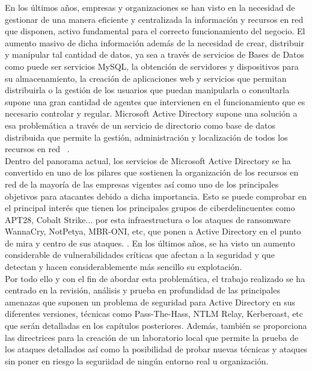 En los últimos años, empresas y organizaciones se han visto en la necesidad de gestionar de una manera eficiente y centralizada la información y recursos en red que disponen, activo fundamental para el correcto funcionamiento del negocio. El aumento masivo de dicha información además de la necesidad de crear, distribuir y manipular tal cantidad de datos, ya sea a través de servicios de Bases de Datos como puede ser servicios MySQL, la obtención de servidores y dispositivos para su almacenamiento, la creación de  aplicaciones web y servicios que permitan distribuirla o la gestión de los usuarios que puedan manipularla o consultarla supone una gran cantidad de agentes que intervienen en el funcionamiento que es necesario controlar y regular. Microsoft Active Directory supone una solución a esa problemática a través de un servicio de directorio como base de datos distribuida que permite la gestión, administración y localización de todos los recursos en red ~\cite{Capitulo1:Microsoft}.\\

Dentro del panorama actual, los servicios de Microsoft Active Directory se ha convertido en uno de los pilares que sostienen la organización de los recursos en red de la mayoría de las empresas vigentes así como uno de los principales objetivos para atacantes  debido a dicha importancia. Esto se puede comprobar en el principal interés que tienen los principales grupos de ciberdelincuentes como APT28, Cobalt Strike...  por esta infraestructura o los ataques de ransomware WannaCry, NotPetya, MBR-ONI, etc, que ponen a Active Directory en el punto de mira y centro de sus ataques. \cite{Capitulo1:Ransomware}. En los últimos años, se ha visto un aumento considerable de vulnerabilidades críticas que afectan a la seguridad y que detectan y hacen considerablemente más sencillo su explotación. \\

Por todo ello y con el fin de abordar esta problemática, el trabajo realizado se ha centrado en la revisión, análisis y prueba  en profundidad de las principales amenazas que suponen un problema de seguridad para Active Directory en sus diferentes versiones, técnicas como Pass-The-Hass, NTLM Relay, Kerberoast, etc que serán detalladas en los capítulos posteriores. Además, también se proporciona las directrices para la creación de un laboratorio local que permite la prueba de los ataques detallados así como la posibilidad de probar nuevas técnicas y ataques sin poner en riesgo la seguriidad de ningún entorno real u organización.\\


